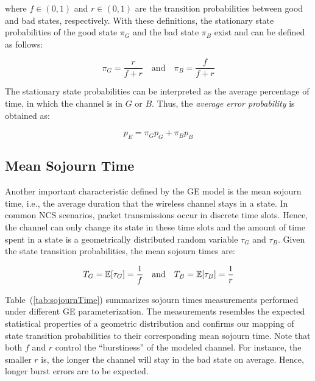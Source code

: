 where $f\in(0,1)$ and $r\in(0,1)$ are the transition probabilities between good
and bad states, respectively. With these definitions, the stationary state
probabilities of the good state $\pi_G$ and the bad state $\pi_B$ exist and can
be defined as follows:

\begin{equation}
  \pi_G = \frac{r}{f+r} \quad \textrm{and} \quad \pi_B = \frac{f}{f+r}
\end{equation}

The stationary state probabilities can be interpreted as the average percentage
of time, in which the channel is in $G$ or $B$. Thus, the \textit{average error
probability} is obtained as:

\begin{equation}
  p_E = \pi_G p_G + \pi_B p_B
  \label{eq:avgLoss}
\end{equation}

\subsection{Mean Sojourn Time}
Another important characteristic defined by the GE model is the mean sojourn
time, i.e., the average duration that the wireless channel stays in a state. In
common NCS scenarios, packet transmissions occur in discrete time slots. Hence,
the channel can only change its state in these time slots and the amount of time
spent in a state is a geometrically distributed random variable $\tau_G$ and
$\tau_B$. Given the state transition probabilities, the mean sojourn times are:

\begin{equation}
  T_G = \mathbb{E}[\tau_G] = \frac{1}{f} \quad \textrm{and} \quad T_B = \mathbb{E}[\tau_B] = \frac{1}{r}
\end{equation}

Table~(\ref{tab:sojournTime}) summarizes sojourn times measurements performed
under different GE parameterization. The measurements resembles the expected
statistical properties of a geometric distribution and confirms our mapping of
state transition probabilities to their corresponding mean sojourn time. Note
that both $f$ and $r$ control the ``burstiness'' of the modeled channel. For
instance, the smaller $r$ is, the longer the channel will stay in the bad state
on average. Hence, longer burst errors are to be expected. 

